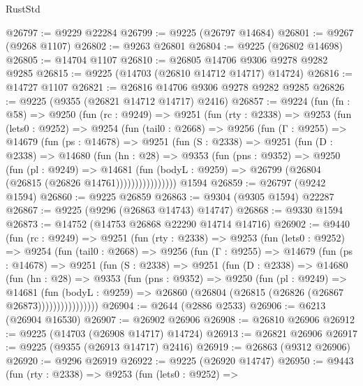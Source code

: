 \begin{lexlean}{RustStd}
\begin{coremodule}
@26797 := @9229 @22284
@26799 := @9225 (@26797 @14684)
@26801 := @9267 (@9268 @1107)
@26802 := @9263 @26801
@26804 := @9225 (@26802 @14698)
@26805 := @14704 @1107
@26810 := @26805 @14706 @9306 @9278 @9282 @9285
@26815 := @9225 (@14703 (@26810 @14712 @14717) @14724)
@26816 := @14727 @1107
@26821 := @26816 @14706 @9306 @9278 @9282 @9285
@26826 := @9225 (@9355 (@26821 @14712 @14717) @2416)
@26857 := @9224
    (fun (fn : @58) =>
    @9250
      (fun (rc : @9249) =>
      @9251
        (fun (rty : @2338) =>
        @9253
          (fun (lets0 : @9252) =>
          @9254
            (fun (tail0 : @2668) =>
            @9256
              (fun (Γ : @9255) =>
              @14679
                (fun (ps : @14678) =>
                @9251
                  (fun (S : @2338) =>
                  @9251
                    (fun (D : @2338) =>
                    @14680
                      (fun (hn : @28) =>
                      @9353
                        (fun (pns : @9352) =>
                        @9250
                          (fun (pl : @9249) =>
                          @14681
                            (fun (bodyL : @9259) =>
                            @26799 (@26804 (@26815 (@26826 @14761))))))))))))))))
    @1594
@26859 := @26797 (@9242 @1594)
@26860 := @9225 @26859
@26863 := @9304 (@9305 @1594) @22287
@26867 := @9225 (@9296 (@26863 @14743) @14747)
@26868 := @9330 @1594
@26873 := @14752 (@14753 @26868 @22290 @14714 @14716)
@26902 := @9440
    (fun (rc : @9249) =>
    @9251
      (fun (rty : @2338) =>
      @9253
        (fun (lets0 : @9252) =>
        @9254
          (fun (tail0 : @2668) =>
          @9256
            (fun (Γ : @9255) =>
            @14679
              (fun (ps : @14678) =>
              @9251
                (fun (S : @2338) =>
                @9251
                  (fun (D : @2338) =>
                  @14680
                    (fun (hn : @28) =>
                    @9353
                      (fun (pns : @9352) =>
                      @9250
                        (fun (pl : @9249) =>
                        @14681
                          (fun (bodyL : @9259) =>
                          @26860 (@26804 (@26815 (@26826 (@26867 @26873))))))))))))))))
@26904 := @2644 (@2886 @2533)
@26906 := @6213 (@26904 @16530)
@26907 := @26902 @26906
@26908 := @26810 @26906
@26912 := @9225 (@14703 (@26908 @14717) @14724)
@26913 := @26821 @26906
@26917 := @9225 (@9355 (@26913 @14717) @2416)
@26919 := @26863 (@9312 @26906)
@26920 := @9296 @26919
@26922 := @9225 (@26920 @14747)
@26950 := @9443
    (fun (rty : @2338) =>
    @9253
      (fun (lets0 : @9252) =>

\end{coremodule}
\end{lexlean}
